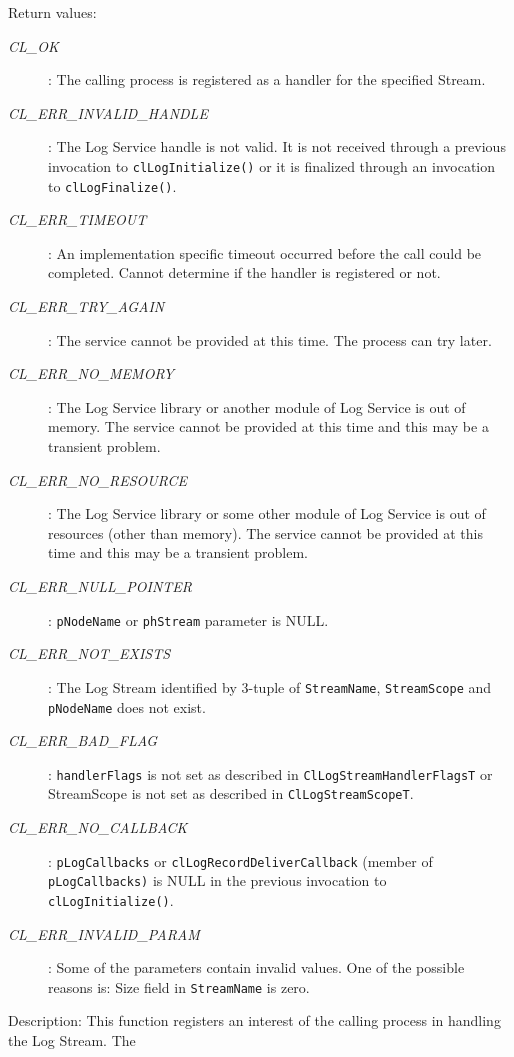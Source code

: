 \begin{flushleft}
\begin{Desc}
\item[Return values:]
\begin{description}
\item[{\em CL\_\-OK}]: The calling process is registered as a handler for the specified Stream.
\item[{\em CL\_\-ERR\_\-INVALID\_\-HANDLE}]: The Log Service handle is not valid. It is not received through a previous invocation to
{\tt{clLogInitialize()}} or it is finalized through an invocation to {\tt{clLogFinalize()}}.
\item[{\em CL\_\-ERR\_\-TIMEOUT}]: An implementation specific timeout occurred before the call could be completed. Cannot determine if 
the handler is registered or not.
\item[{\em CL\_\-ERR\_\-TRY\_\-AGAIN}]: The service cannot be provided at this time. The process can try later.
\item[{\em CL\_\-ERR\_\-NO\_\-MEMORY}]: The Log Service library or another module of Log Service is out of memory. The service cannot 
be provided at this time and this may be a transient problem.
\item[{\em CL\_\-ERR\_\-NO\_\-RESOURCE}]: The Log Service library or some other module of Log Service is out of resources 
(other than memory). The service cannot be provided at this time and this may be a transient problem.
\item[{\em CL\_\-ERR\_\-NULL\_\-POINTER}]: {\tt{pNodeName}} or {\tt{phStream}} parameter is NULL.
\item[{\em CL\_\-ERR\_\-NOT\_\-EXISTS}]: The Log Stream identified by 3-tuple of {\tt{StreamName}}, {\tt{StreamScope}} and 
{\tt{pNodeName}} does not exist.
\item[{\em CL\_\-ERR\_\-BAD\_\-FLAG}]: {\tt{handlerFlags}} is not set as described in {\tt{ClLogStreamHandlerFlagsT}} or StreamScope is not set as
described in {\tt{ClLogStreamScopeT}}.
\item[{\em CL\_\-ERR\_\-NO\_\-CALLBACK}]: {\tt{pLogCallbacks}} or {\tt{clLogRecordDeliverCallback}} (member of {\tt{pLogCallbacks)}} is NULL in the 
previous invocation to {\tt{clLogInitialize()}}.
\item[{\em CL\_\-ERR\_\-INVALID\_\-PARAM}]: Some of the parameters contain invalid values. One of the possible reasons is:
Size field in {\tt{StreamName}} is zero.
\end{description}
\end{Desc}
\begin{Desc}
\item[Description:] This function registers an interest of the calling process in handling the Log Stream. The 

\end{Desc}
\end{flushleft}
